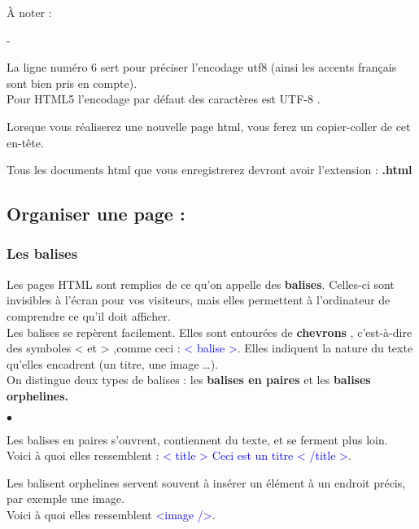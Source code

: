 \documentclass[10pt,dvipsnames, dvips, svgnames]{article}
\begin{document}
À noter :\begin{list}{-}{}
\item  La ligne numéro 6 sert pour préciser  l'encodage utf8 (ainsi les accents \og français \fg sont  bien pris en compte).\\
Pour HTML5 l'encodage par défaut des caractères est UTF-8 .
\item  Lorsque vous réaliserez une nouvelle page html, vous ferez un \og copier-coller \fg de cet en-tête.
\item Tous les documents html que vous enregistrerez devront avoir l'extension : \textbf{.html}
\end{list}


\subsection{Organiser une page :}

\subsubsection{Les balises}

Les pages HTML sont remplies de ce qu'on appelle des \textbf{balises}. Celles-ci sont invisibles à l'écran pour vos visiteurs, mais elles permettent à l'ordinateur de comprendre ce qu'il doit afficher.\\
Les balises se repèrent facilement. Elles sont entourées de \og \textbf{chevrons} \fg, c'est-à-dire des symboles < et > ,comme ceci :  \textcolor{Blue}{< balise >}. Elles indiquent la nature du texte qu'elles encadrent (un titre, une image \dots).\\ %
On distingue deux types de balises : les \textbf{balises en paires} et les \textbf{balises orphelines.}

\begin{list}{$\bullet$}{}
\item Les balises en paires s'ouvrent, contiennent du texte, et se ferment plus loin.\\
	Voici à quoi elles ressemblent :  \textcolor{Blue}{< title > Ceci est un titre < /title >}.
\item Les balisent orphelines servent souvent à insérer un élément à un endroit précis, par exemple une image.\\
Voici à quoi elles ressemblent  \textcolor{Blue}{<image />}.
\end{list}
\end{document}
